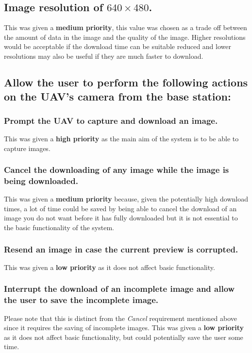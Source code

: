 	\subsection{Image resolution of \textbf{$640\times480$}.} \label{sec:spec_d} 
This was given a \textbf{medium priority}, this value was chosen as a trade off between the amount of data in the image and the quality of the image. Higher resolutions would be acceptable if the download time can be suitable reduced and lower resolutions may also be useful if they are much faster to download.
	\subsection{Allow the user to perform the following actions on the UAV’s camera from the base station:} 
		\subsubsection{Prompt the UAV to \textbf{capture and download an image}.} \label{sec:spec_e} 
This was given a \textbf{high priority} as the main aim of the system is to be able to capture images.
		\subsubsection{\textbf{Cancel} the downloading of any image while the image is being downloaded.} \label{sec:spec_f} 
This was given a \textbf{medium priority} because, given the potentially high download times, a lot of time could be saved by being able to cancel the download of an image you do not want before it has fully downloaded but it is not essential to the basic functionality of the system.
		\subsubsection{\textbf{Resend} an image in case the current preview is corrupted.} \label{sec:spec_g} 
This was given a \textbf{low priority} as it does not affect basic functionality.
		\subsubsection{\textbf{Interrupt} the download of an incomplete image and allow the user to save the incomplete image.} \label{sec:spec_h} 
Please note that this is distinct from the \emph{Cancel} requirement mentioned above since it requires the saving of incomplete images. This was given a \textbf{low priority} as it does not affect basic functionality, but could potentially save the user some time.
